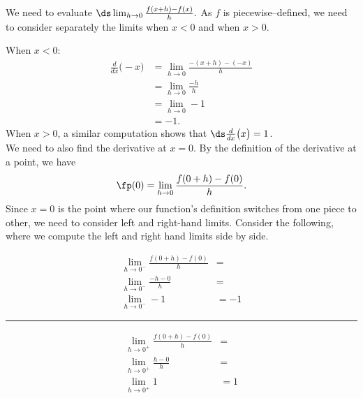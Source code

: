 {We need to evaluate $\ds \lim_{h\to0}\frac{f(x+h)-f(x)}{h}.$ As $f$ is piecewise--defined, we need to consider separately the limits when $x<0$ and when $x>0$. \\


When $x<0$:
	\begin{align*}
	\frac{d}{dx}\big(-x\big) 	&= \lim_{h\to 0}\frac{-(x+h) - (-x)}{h} \\
														&=	\lim_{h\to 0}\frac{-h}{h}\\
														&=	\lim_{h\to 0}-1 \\
														&=	-1.
	\end{align*}
When $x>0$, a similar computation shows that $\ds \frac{d}{dx}\big(x\big) = 1$. \\

We need to also find the derivative at $x=0$. By the definition of the derivative at a point, we have 
\[
\fp(0) = \lim_{h\to0}\frac{f(0+h)-f(0)}{h}.
\]
Since $x=0$ is the point where our function's definition switches from one piece to other, we need to consider left and right-hand limits. Consider the following, where we compute the left and right hand limits side by side.

\noindent\begin{minipage}[b]{.5\linewidth}
\begin{align*}
\lim_{h\to0^-}\frac{f(0+h)-f(0)}{h} &= \\
\lim_{h\to0^-}\frac{-h-0}{h} &= \\
\lim_{h\to0^-}-1 & =-1
\end{align*}
\end{minipage}\rule{.5pt}{70pt}
\begin{minipage}[b]{.5\linewidth}
\begin{align*}
\lim_{h\to0^+}\frac{f(0+h)-f(0)}{h} &= \\
\lim_{h\to0^+}\frac{h-0}{h} &= \\
\lim_{h\to0^+}1 & =1
\end{align*}
\end{minipage}

}
